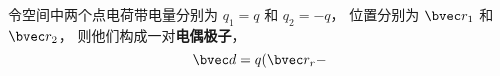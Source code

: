 


令空间中两个点电荷带电量分别为 $q_1 = q$ 和 $q_2 = -q$， 位置分别为 $\bvec r_1$ 和 $\bvec r_2$， 则他们构成一对\textbf{电偶极子}，
\begin{equation}
\bvec d = q (\bvec r_r - 
\end{equation}

